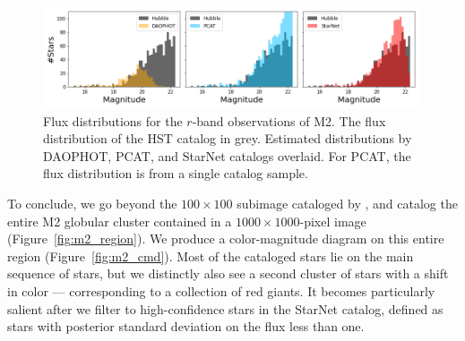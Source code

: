 
\begin{figure}[tb]
    \centering
    \includegraphics[width=0.99\textwidth]{figures/m2_results/luminosity_fun.png}
    \vspace{-0.4cm}
    \caption{Flux distributions for the $r$-band observations of M2.
    The flux distribution of the HST catalog in grey.
    Estimated distributions by DAOPHOT, PCAT, and StarNet catalogs overlaid.
    For PCAT, the flux distribution is from a single catalog sample. }
    \label{fig:luminosity_fun_m2}
\end{figure}




To conclude, 
we go beyond the $100\times100$ subimage
cataloged by \cite{Feder_2019}, and 
catalog the entire M2 globular cluster 
contained in a $1000 \times 1000$-pixel image (Figure~\ref{fig:m2_region}). 
We produce a color-magnitude diagram on this entire region (Figure~\ref{fig:m2_cmd}). 
Most of the cataloged stars lie on the 
main sequence of stars, but
we distinctly 
also see a second cluster of stars 
with a shift in color --- corresponding to 
a collection of red giants. 
It becomes particularly salient after we filter to
high-confidence stars in the StarNet catalog, defined as stars with posterior standard deviation on the flux less than one. 



